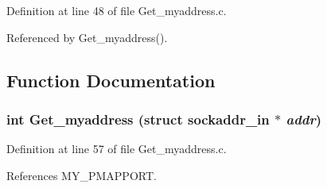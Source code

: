Definition at line 48 of file Get\_\-myaddress.c.

Referenced by Get\_\-myaddress().

\subsection{Function Documentation}
\subsubsection{\setlength{\rightskip}{0pt plus 5cm}int Get\_\-myaddress (struct sockaddr\_\-in $\ast$ {\em addr})}\label{Get__myaddress_8c_a1}




Definition at line 57 of file Get\_\-myaddress.c.

References MY\_\-PMAPPORT.